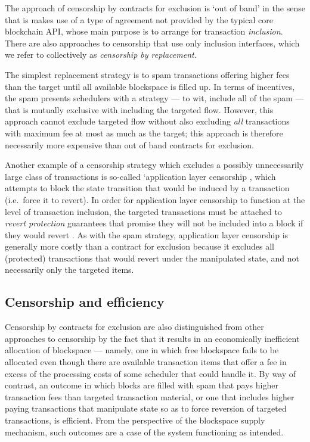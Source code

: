 The approach of censorship by contracts for exclusion is `out of band' in the sense that is makes use of a type of agreement not provided by the typical core blockchain API, whose main purpose is to arrange for transaction \emph{inclusion}.
%
There are also approaches to censorship that use only inclusion interfaces, which we refer to collectively as \emph{censorship by replacement}.

The simplest replacement strategy is to spam transactions offering higher fees than the target until all available blockspace is filled up.
%
In terms of incentives, the spam presents schedulers with a strategy --- to wit, include all of the spam --- that is mutually exclusive with including the targeted flow.
%
However, this approach cannot exclude targeted flow without also excluding \emph{all} transactions with maximum fee at most as much as the target; this approach is therefore necessarily more expensive than out of band contracts for exclusion.

Another example of a censorship strategy which excludes a possibly unnecessarily large class of transactions is so-called `application layer censorship \cite[Def.~4]{wahrstatter2024blockchain}, which attempts to block the state transition that would be induced by a transaction (i.e.~force it to revert).
%
In order for application layer censorship to function at the level of transaction inclusion, the targeted transactions must be attached to \emph{revert protection} guarantees that promise they will not be included into a block if they would revert \cite{zhu2024quantifying}.
%
As with the spam strategy, application layer censorship is generally more costly than a contract for exclusion because it excludes all (protected) transactions that would revert under the manipulated state, and not necessarily only the targeted items.

\subsection{Censorship and efficiency}

Censorship by contracts for exclusion are also distinguished from other approaches to censorship by the fact that it results in an economically inefficient allocation of blockspace --- namely, one in which free blockspace fails to be allocated even though there are available transaction items that offer a fee in excess of the processing costs of some scheduler that could handle it.
%
By way of contrast, an outcome in which blocks are filled with spam that pays higher transaction fees than targeted transaction material, or one that includes higher paying transactions that manipulate state so as to force reversion of targeted transactions, is efficient.
%
From the perspective of the blockspace supply mechanism, such outcomes are a case of the system functioning as intended.

